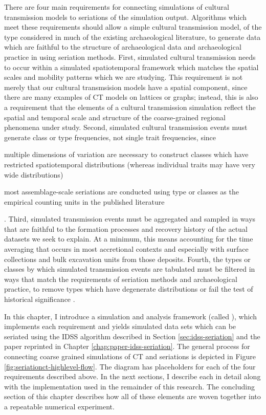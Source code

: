 There are four main requirements for connecting simulations of cultural transmission models to seriations of the simulation output.  Algorithms which meet these requirements should allow a simple cultural transmission model, of the type considered in much of the existing archaeological literature, to generate data which are faithful to the structure of archaeological data and archaeological practice in using seriation methods.  First, simulated cultural transmission needs to occur within a simulated spatiotemporal framework which matches the spatial scales and mobility patterns which we are studying.  This requirement is not merely that our cultural transmsision models have a spatial component, since there are many examples of CT models on lattices or graphs; instead, this is also a requirement that the elements of a cultural transmission simulation reflect the spatial and temporal scale and structure of the coarse-grained regional phenomena under study.  Second, simulated cultural transmission events must generate class or type frequencies, not single trait frequencies, since 
\begin{dissparalist}
\item multiple dimensions of variation are necessary to construct classes which have restricted spatiotemporal distributions (whereas individual traits may have very wide distributions)
\item most assemblage-scale seriations are conducted using type or classes as the empirical counting units in the published literature
\end{dissparalist}.
Third, simulated transmission events must be aggregated and sampled in ways that are faithful to the formation processes and recovery history of the actual datasets we seek to explain.  At a minimum, this means accounting for the time averaging that occurs in most accretional contexts and especially with surface collections and bulk excavation units from those deposits.   Fourth, the types or classes by which simulated transmission events are tabulated must be filtered in ways that match the requirements of seriation methods and archaeological practice, to remove types which have degenerate distributions or fail the test of historical significance \citep{Krieger1944}.  



In this chapter, I introduce a simulation and analysis framework (called ), which implements each requirement and yields simulated data sets which can be seriated using the IDSS algorithm described in Section \ref{sec:idss-seriation} and the paper reprinted in Chapter \ref{chap:paper-idss-seriation}.  The general process for connecting coarse grained simulations of CT and seriations is depicted in Figure \ref{fig:seriationct-highlevel-flow}.  The diagram has placeholders for each of the four requirements described above.  In the next sections, I describe each in detail along with the implementation used in the remainder of this research.  The concluding section of this chapter describes how all of these elements are woven together into a repeatable numerical experiment.  




